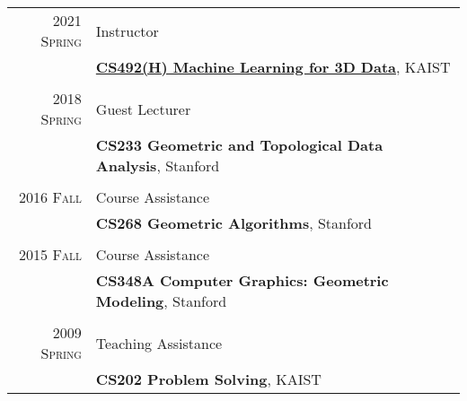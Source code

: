 \documentclass[letterpaper,10pt]{article} %
\newcommand{\blankline}{\quad\pagebreak[2]}
\begin{document}
{\begin{tabular}{r|p{11cm}}
\textsc{2021 Spring} & Instructor\\
& \href{https://mhsung.github.io/courses/kaist-cs492-3dml-2021-spring}{\textbf{CS492(H) Machine Learning for 3D Data}}, KAIST\\
& \\


\textsc{2018 Spring} & Guest Lecturer\\
& \textbf{CS233 Geometric and Topological Data Analysis}, Stanford\\
& \\


\textsc{2016 Fall} & Course Assistance\\
& \textbf{CS268 Geometric Algorithms}, Stanford\\
& \\


\textsc{2015 Fall} & Course Assistance\\
& \textbf{CS348A Computer Graphics: Geometric Modeling}, Stanford\\
& \\


\textsc{2009 Spring} & Teaching Assistance\\
& \textbf{CS202 Problem Solving}, KAIST\\
\end{tabular}\\

\blankline



%
%

}
\end{document}
